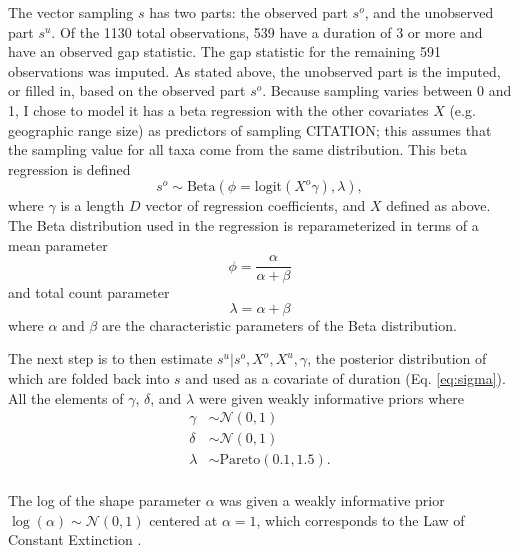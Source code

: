 \documentclass{article}
\begin{document}
The vector sampling \(s\) has two parts: the observed part \(s^{o}\), and the unobserved part \(s^{u}\). Of the 1130 total observations, 539 have a duration of 3 or more and have an observed gap statistic. The gap statistic for the remaining 591 observations was imputed. As stated above, the unobserved part is the imputed, or filled in, based on the observed part \(s^{o}\). Because sampling varies between 0 and 1, I chose to model it has a beta regression with the other covariates \(X\) (e.g. geographic range size) as predictors of sampling CITATION; this assumes that the sampling value for all taxa come from the same distribution. This beta regression is defined
\begin{equation*}
  s^{o} \sim \mathrm{Beta}(\phi = \text{logit}(X^{o} \gamma), \lambda),
\end{equation*}
where \(\gamma\) is a length \(D\) vector of regression coefficients, and \(X\) defined as above. The Beta distribution used in the regression is reparameterized in terms of a mean parameter
\begin{equation*}
  \phi = \frac{\alpha}{\alpha + \beta}
\end{equation*}
and total count parameter
\begin{equation}
  \lambda = \alpha + \beta
\end{equation}
where \(\alpha\) and \(\beta\) are the characteristic parameters of the Beta distribution.

The next step is to then estimate \(s^{u} | s^{o}, X^{o}, X^{u}, \gamma\), the posterior distribution of which are folded back into \(s\) and used as a covariate of duration (Eq. \ref{eq:sigma}). All the elements of \(\gamma\), \(\delta\), and \(\lambda\) were given weakly informative priors where
\begin{equation*}
  \begin{aligned}
    \gamma &\sim \mathcal{N}(0, 1) \\
    \delta &\sim \mathcal{N}(0, 1) \\
    \lambda &\sim \mathrm{Pareto}(0.1, 1.5). \\
  \end{aligned}
\end{equation*}

The log of the shape parameter \(\alpha\) was given a weakly informative prior \(\log(\alpha) \sim \mathcal{N}(0, 1)\) centered at \(\alpha = 1\), which corresponds to the Law of Constant Extinction \citep{VanValen1973}.
\end{document}
